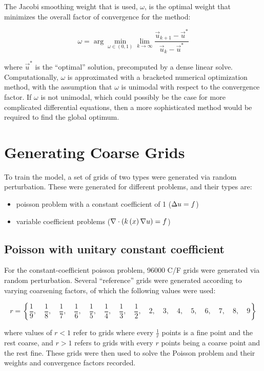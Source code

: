 The Jacobi smoothing weight that is used, $\omega$, is the optimal weight that minimizes the overall factor of convergence for the method:

$$\omega = \arg \min_{\omega\in\left(0,1\right)} \lim_{k\to\infty} \frac{ \vec{u}_{k+1} - \vec{u}^* }{ \vec{u}_{k} - \vec{u}^* }$$

where $\vec{u}^*$ is the ``optimal'' solution, precomputed by a dense linear solve.  Computationally, $\omega$ is approximated with a bracketed numerical optimization method, with the assumption that $\omega$ is unimodal with respect to the convergence factor.  If $\omega$ is not unimodal, which could possibly be the case for more complicated differential equations, then a more sophisticated method would be required to find the global optimum.

\section{Generating Coarse Grids}

To train the model, a set of grids of two types were generated via random perturbation.  These were generated for different problems, and their types are:
\begin{itemize}
\item poisson problem with a constant coefficient of 1 ($\Delta u = f$)
\item variable coefficient problems ($\nabla \cdot \left(k\left(x\right)\nabla u\right) = f$)
\end{itemize}

\subsection{Poisson with unitary constant coefficient}

For the constant-coefficient poisson problem, 96000 C/F grids were generated via random perturbation.  Several ``reference'' grids were generated according to varying coarsening factors, of which the following values were used:

$$r = \left\{
\frac{1}{9},\quad
\frac{1}{8},\quad
\frac{1}{7},\quad
\frac{1}{6},\quad
\frac{1}{5},\quad
\frac{1}{4},\quad
\frac{1}{3},\quad
\frac{1}{2},\quad
2,\quad
3,\quad
4,\quad
5,\quad
6,\quad
7,\quad
8,\quad
9
\right\}$$

where values of $r<1$ refer to grids where every $\frac{1}{r}$ points is a fine point and the rest coarse, and $r>1$ refers to grids with every $r$ points being a coarse point and the rest fine.  These grids were then used to solve the Poisson problem and their weights and convergence factors recorded.

